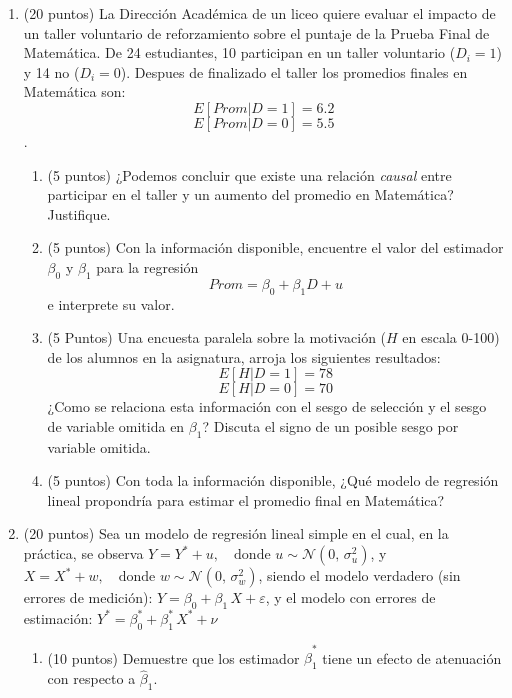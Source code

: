 \documentclass[10pt,a4paper]{article}
\begin{document}
\begin{enumerate}
    \item (20 puntos) La Dirección Académica de un liceo quiere evaluar el impacto de un taller voluntario de reforzamiento sobre el puntaje de la Prueba Final de Matemática. De 24 estudiantes, 10 participan en un taller voluntario ($D_i=1$) y 14 no ($D_i=0$). Despues de finalizado el taller los promedios finales en Matemática son:
    $$ E[Prom|D=1]=6.2$$
    $$E[Prom|D=0]=5.5$$.

\begin{enumerate}
    \item  (5 puntos) ¿Podemos concluir que existe una relación \textit{causal} entre participar en el taller y un aumento del promedio en Matemática? Justifique. 

    \item  (5 puntos) Con la información disponible, encuentre el valor del estimador $\beta_0$ y $\beta_1$ para la regresión
    $$Prom = \beta_0 + \beta_1 D + u$$
 e interprete su valor.
 
    \item (5 Puntos) Una encuesta paralela sobre la motivación ($H$ en escala 0-100) de los alumnos en la asignatura, arroja los siguientes resultados:
    $$E[H|D=1]=78$$
    $$E[H|D=0]=70$$
    ¿Como se relaciona esta información con el sesgo de selección y el sesgo de variable omitida en $\beta_1$? Discuta el signo de un posible sesgo por variable omitida.

    \item (5 puntos) Con toda la información disponible, ¿Qué modelo de regresión lineal propondría para estimar el promedio final en Matemática?

\end{enumerate}

\item (20 puntos) Sea un modelo de regresión lineal simple en el cual, en la práctica, se observa $
Y = Y^* + u, \quad \text{donde } u \sim \mathcal{N}(0,\,\sigma_u^2)$, y $
X = X^* + w, \quad \text{donde } w \sim \mathcal{N}(0,\,\sigma_w^2)$,
siendo el modelo verdadero (sin errores de medición): $
Y = \beta_0 + \beta_1 \, X + \varepsilon$, y el modelo con errores de estimación: $
Y^* = \beta^*_0 + \beta^*_1 \, X^* + \nu$
\begin{enumerate}
    \item (10 puntos) Demuestre que los estimador $\hat{\beta}^*_1$ tiene un efecto de atenuación con respecto a $\hat{\beta}_1$. 
    

\end{enumerate}
\end{enumerate}
\end{document}
